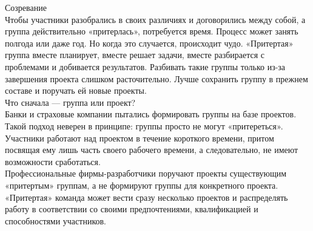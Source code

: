 \documentclass{../industrial-development}
\begin{document}
Созревание\\
Чтобы участники разобрались в своих различиях и договорились между собой, а группа действительно «притерлась», потребуется время. Процесс может занять полгода или даже год. Но когда это случается, происходит чудо. «Притертая» группа вместе планирует, вместе решает задачи, вместе разбирается с проблемами и добивается результатов. Разбивать такие группы только из-за завершения проекта слишком расточительно. Лучше сохранить группу в прежнем составе и поручать ей новые проекты.\\
Что сначала — группа или проект?\\
Банки и страховые компании пытались формировать группы на базе проектов. Такой подход неверен в принципе: группы просто не могут «притереться». Участники работают над проектом в течение короткого времени, притом посвящая ему лишь часть своего рабочего времени, а следовательно, не имеют возможности сработаться.\\
Профессиональные фирмы-разработчики поручают проекты существующим «притертым» группам, а не формируют группы для конкретного проекта. «Притертая» команда может вести сразу несколько проектов и распределять работу в соответствии со своими предпочтениями, квалификацией и способностями участников.
\end{document}

